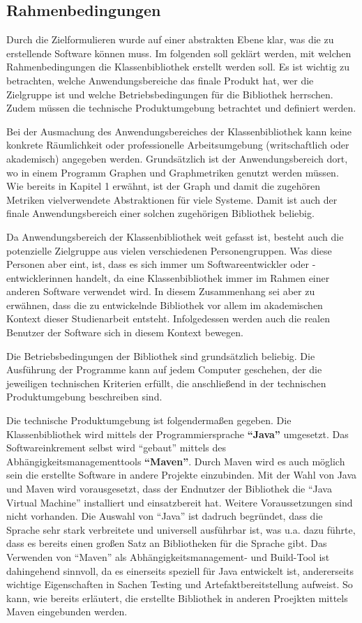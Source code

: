 \documentclass[a4paper,12pt,ngerman,chapterprefix=false,listof=totoc,bibliography=totoc]{scrreprt}
\begin{document}
{{\subsection{Rahmenbedingungen}
{
Durch die Zielformulieren wurde auf einer abstrakten Ebene klar, was die zu erstellende Software können muss. Im folgenden soll geklärt werden, mit welchen Rahmenbedingungen die Klassenbibliothek erstellt werden soll. Es ist wichtig zu betrachten, welche Anwendungsbereiche das finale Produkt hat, wer die Zielgruppe ist und welche Betriebsbedingungen für die Bibliothek herrschen. Zudem müssen die technische Produktumgebung betrachtet und definiert werden. \cite{balzert_lehrbuch_2009}

Bei der Ausmachung des Anwendungsbereiches der Klassenbibliothek kann keine konkrete Räumlichkeit oder professionelle Arbeitsumgebung (writschaftlich oder akademisch) angegeben werden. Grundsätzlich ist der Anwendungsbereich dort, wo in einem Programm Graphen und Graphmetriken genutzt werden müssen. Wie bereits in Kapitel 1 erwähnt, ist der Graph und damit die zugehören Metriken vielverwendete Abstraktionen für viele Systeme. \cite{turau_algorithmische_2004} Damit ist auch der finale Anwendungsbereich einer solchen zugehörigen Bibliothek beliebig.

Da Anwendungsbereich der Klassenbibliothek weit gefasst ist, besteht auch die potenzielle Zielgruppe aus vielen verschiedenen Personengruppen. Was diese Personen aber eint, ist, dass es sich immer um Softwareentwickler oder -entwicklerinnen handelt, da eine Klassenbibliothek immer im Rahmen einer anderen Software verwendet wird. In diesem Zusammenhang sei aber zu erwähnen, dass die zu entwickelnde Bibliothek vor allem im akademischen Kontext dieser Studienarbeit entsteht. Infolgedessen werden auch die realen Benutzer der Software sich in diesem Kontext bewegen.

Die Betriebsbedingungen der Bibliothek sind grundsätzlich beliebig. Die Ausführung der Programme kann auf jedem Computer geschehen, der die jeweiligen technischen Kriterien erfüllt, die anschließend in der technischen Produktumgebung beschreiben sind.

Die technische Produktumgebung ist folgendermaßen gegeben. Die Klassenbibliothek wird mittels der Programmiersprache \textbf{"`Java"'} umgesetzt. Das Softwareinkrement selbst wird "`gebaut"' mittels des Abhängigkeitsmanagementtools \textbf{"`Maven"'}. Durch Maven wird es auch möglich sein die erstellte Software in andere Projekte einzubinden.  Mit der Wahl von Java und Maven wird vorausgesetzt, dass der Endnutzer der Bibliothek die "`Java Virtual Machine"' installiert und einsatzbereit hat. Weitere Voraussetzungen sind nicht vorhanden. Die Auswahl von "`Java"' ist dadruch begründet, dass die Sprache sehr stark verbreitete und universell ausführbar ist, was u.a. dazu führte, dass es bereits einen großen Satz an Bibliotheken für die Sprache gibt. Das Verwenden von "`Maven"' als Abhängigkeitsmanagement- und Build-Tool ist dahingehend sinnvoll, da es einerseits speziell für Java entwickelt ist, andererseits wichtige Eigenschaften in Sachen Testing und Artefaktbereitstellung aufweist. So kann, wie bereits erläutert, die erstellte Bibliothek in anderen Proejkten mittels Maven eingebunden werden. \cite{ullenboom_java_2016,srirangan_apache_2011}
}
}}
\end{document}
